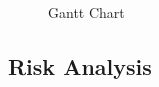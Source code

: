 \documentclass[runningheads]{llncs}
\begin{document}
\begin{figure}[htbp]
\begin{sideways}
\begin{ganttchart}
                    

                \end{ganttchart}
            \end{sideways}
        \caption{Gantt Chart}~\label{fig:gantt}
        \end{figure}
    \subsection{Risk Analysis}
\end{document}
